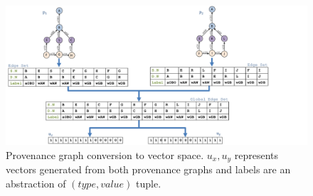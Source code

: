 \begin{figure}
\begin{center}
\includegraphics[width=\textwidth]{picture13_edit_1.pdf}
\end{center}
\caption{Provenance graph conversion to vector space. $u_x, u_y$ represents vectors generated from both provenance graphs and labels are an abstraction of $(type, value)$ tuple. }
\label{prov_vector}
\end{figure}








 




